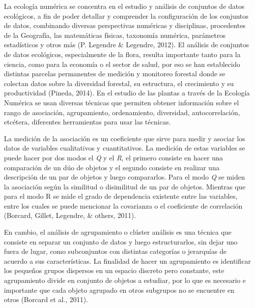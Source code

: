 \documentclass[11pt,]{article}
\begin{document}
La ecología numérica se concentra en el estudio y análisis de conjuntos
de datos ecológicos, a fin de poder detallar y comprender la
configuración de los conjuntos de datos, combinando diversas
perspectivas numéricas y disciplinas, procedentes de la Geografía, las
matemáticas físicas, taxonomía numérica, parámetros estadísticos y otros
más (P. Legendre \& Legendre, 2012). El análisis de conjuntos de datos
ecológicos, especialmente de la flora, resulta importante tanto para la
ciencia, como para la economía o el sector de salud, por eso se han
establecido distintas parcelas permanentes de medición y monitoreo
forestal donde se colectan datos sobre la diversidad forestal, su
estructura, el crecimiento y su productividad (Pineda, 2014). En el
estudio de las plantas a través de la Ecología Numérica se usan diversas
técnicas que permiten obtener información sobre el rango de asociación,
agrupamiento, ordenamiento, diversidad, autocorrelación, etcétera,
diferentes herramientas para usar las técnicas.

La medición de la asociación es un coeficiente que sirve para medir y
asociar los datos de variables cualitativos y cuantitativos. La medición
de estas variables se puede hacer por dos modos el \emph{Q} y el
\emph{R}, el primero consiste en hacer una comparación de un dúo de
objetos y el segundo consiste en realizar una descripción de un par de
objetos y luego compararlos. Para el modo \emph{Q} se miden la
asociación según la similitud o disimilitud de un par de objetos.
Mientras que para el modo R se mide el grado de dependencia existente
entre las variables, entre los cuales se puede mencionar la covarianza o
el coeficiente de correlación (Borcard, Gillet, Legendre, \& others,
2011).

En cambio, el análisis de agrupamiento o clúster análisis es una técnica
que consiste en separar un conjunto de datos y luego estructurarlos, sin
dejar uno fuera de lugar, como subconjuntos con distintas categorías o
jerarquías de acuerdo a sus características. La finalidad de hacer un
agrupamiento es identificar los pequeños grupos dispersos en un espacio
discreto pero constante, este agrupamiento divide en conjunto de objetos
a estudiar, por lo que es necesario e importante que cada objeto
agrupado en otros subgrupos no se encuentre en otros (Borcard et al.,
2011).
\end{document}

